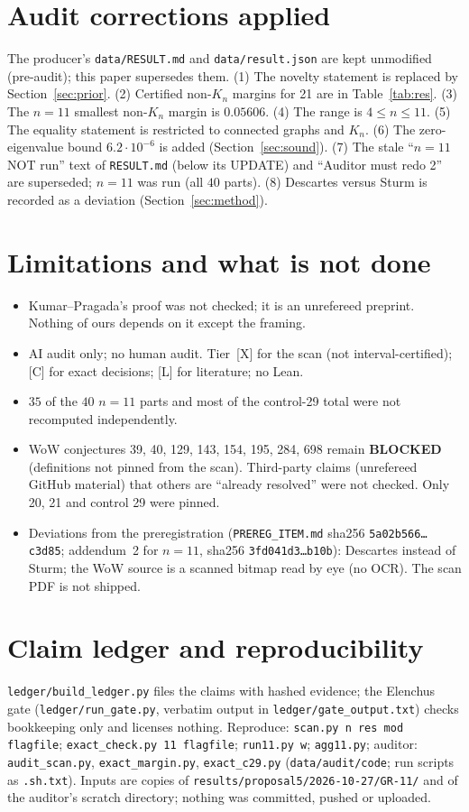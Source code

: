 \documentclass[10pt]{article}
\newcommand{\tier}[1]{\textsf{[#1]}}
\newcommand{\tL}{\tier{L}}
\newcommand{\tC}{\tier{C}}
\newcommand{\tX}{\tier{X}}
\begin{document}
\section{Audit corrections applied}\label{sec:corr}
The producer's \texttt{data/RESULT.md} and \texttt{data/result.json} are kept unmodified (pre-audit); this paper supersedes them.
(1) The novelty statement is replaced by Section~\ref{sec:prior}. (2) Certified non-$K_n$ margins for 21 are in Table~\ref{tab:res}. (3) The $n=11$ smallest non-$K_n$ margin is $0.05606$. (4) The range is $4\le n\le11$. (5) The equality statement is restricted to connected graphs and $K_n$. (6) The zero-eigenvalue bound $6.2\cdot10^{-6}$ is added (Section~\ref{sec:sound}). (7) The stale ``$n=11$ NOT run'' text of \texttt{RESULT.md} (below its UPDATE) and ``Auditor must redo 2'' are superseded; $n=11$ was run (all $40$ parts). (8) Descartes versus Sturm is recorded as a deviation (Section~\ref{sec:method}).

\section{Limitations and what is not done}\label{sec:lim}
\begin{itemize}\itemsep=1pt
\item Kumar--Pragada's proof was not checked; it is an unrefereed preprint. Nothing of ours depends on it except the framing.
\item AI audit only; no human audit. Tier~\tX{} for the scan (not interval-certified); \tC{} for exact decisions; \tL{} for literature; no Lean.
\item $35$ of the $40$ $n=11$ parts and most of the control-29 total were not recomputed independently.
\item WoW conjectures 39, 40, 129, 143, 154, 195, 284, 698 remain \textbf{BLOCKED} (definitions not pinned from the scan). Third-party claims (unrefereed GitHub material) that others are ``already resolved'' were not checked. Only 20, 21 and control 29 were pinned.
\item Deviations from the preregistration (\texttt{PREREG\_ITEM.md} sha256 \texttt{5a02b566\dots c3d85}; addendum~2 for $n=11$, sha256 \texttt{3fd041d3\dots b10b}): Descartes instead of Sturm; the WoW source is a scanned bitmap read by eye (no OCR). The scan PDF is not shipped.
\end{itemize}

\section{Claim ledger and reproducibility}\label{sec:ledger}
\texttt{ledger/build\_ledger.py} files the claims with hashed evidence; the Elenchus gate (\texttt{ledger/run\_gate.py}, verbatim output in \texttt{ledger/gate\_output.txt}) checks bookkeeping only and licenses nothing. Reproduce: \texttt{scan.py n res mod flagfile}; \texttt{exact\_check.py 11 flagfile}; \texttt{run11.py w}; \texttt{agg11.py}; auditor: \texttt{audit\_scan.py}, \texttt{exact\_margin.py}, \texttt{exact\_c29.py} (\texttt{data/audit/code}; run scripts as \texttt{.sh.txt}). Inputs are copies of \texttt{results/proposal5/2026-10-27/GR-11/} and of the auditor's scratch directory; nothing was committed, pushed or uploaded.
\end{document}
